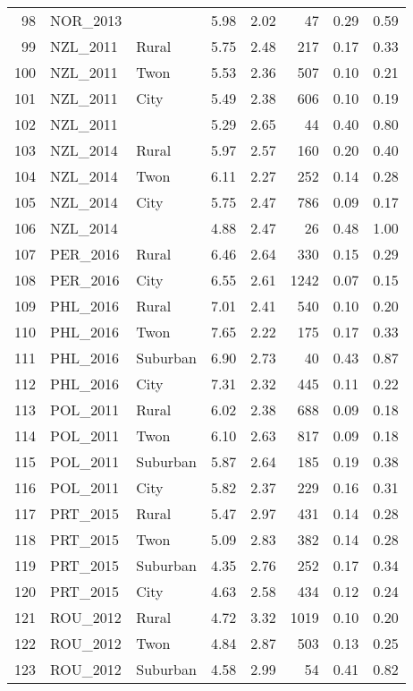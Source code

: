 \documentclass[12pt, titlepage]{article}
\begin{document}
\begin{table}[ht]
\begin{tabular}{rllrrrrr}
		98 & NOR\_2013 &  & 5.98 & 2.02 &  47 & 0.29 & 0.59 \\ 
		99 & NZL\_2011 & Rural & 5.75 & 2.48 & 217 & 0.17 & 0.33 \\ 
		100 & NZL\_2011 & Twon & 5.53 & 2.36 & 507 & 0.10 & 0.21 \\ 
		101 & NZL\_2011 & City & 5.49 & 2.38 & 606 & 0.10 & 0.19 \\ 
		102 & NZL\_2011 &  & 5.29 & 2.65 &  44 & 0.40 & 0.80 \\ 
		103 & NZL\_2014 & Rural & 5.97 & 2.57 & 160 & 0.20 & 0.40 \\ 
		104 & NZL\_2014 & Twon & 6.11 & 2.27 & 252 & 0.14 & 0.28 \\ 
		105 & NZL\_2014 & City & 5.75 & 2.47 & 786 & 0.09 & 0.17 \\ 
		106 & NZL\_2014 &  & 4.88 & 2.47 &  26 & 0.48 & 1.00 \\ 
		107 & PER\_2016 & Rural & 6.46 & 2.64 & 330 & 0.15 & 0.29 \\ 
		108 & PER\_2016 & City & 6.55 & 2.61 & 1242 & 0.07 & 0.15 \\ 
		109 & PHL\_2016 & Rural & 7.01 & 2.41 & 540 & 0.10 & 0.20 \\ 
		110 & PHL\_2016 & Twon & 7.65 & 2.22 & 175 & 0.17 & 0.33 \\ 
		111 & PHL\_2016 & Suburban & 6.90 & 2.73 &  40 & 0.43 & 0.87 \\ 
		112 & PHL\_2016 & City & 7.31 & 2.32 & 445 & 0.11 & 0.22 \\ 
		113 & POL\_2011 & Rural & 6.02 & 2.38 & 688 & 0.09 & 0.18 \\ 
		114 & POL\_2011 & Twon & 6.10 & 2.63 & 817 & 0.09 & 0.18 \\ 
		115 & POL\_2011 & Suburban & 5.87 & 2.64 & 185 & 0.19 & 0.38 \\ 
		116 & POL\_2011 & City & 5.82 & 2.37 & 229 & 0.16 & 0.31 \\ 
		117 & PRT\_2015 & Rural & 5.47 & 2.97 & 431 & 0.14 & 0.28 \\ 
		118 & PRT\_2015 & Twon & 5.09 & 2.83 & 382 & 0.14 & 0.28 \\ 
		119 & PRT\_2015 & Suburban & 4.35 & 2.76 & 252 & 0.17 & 0.34 \\ 
		120 & PRT\_2015 & City & 4.63 & 2.58 & 434 & 0.12 & 0.24 \\ 
		121 & ROU\_2012 & Rural & 4.72 & 3.32 & 1019 & 0.10 & 0.20 \\ 
		122 & ROU\_2012 & Twon & 4.84 & 2.87 & 503 & 0.13 & 0.25 \\ 
		123 & ROU\_2012 & Suburban & 4.58 & 2.99 &  54 & 0.41 & 0.82 \\ 

\end{tabular}
\end{table}
\end{document}
